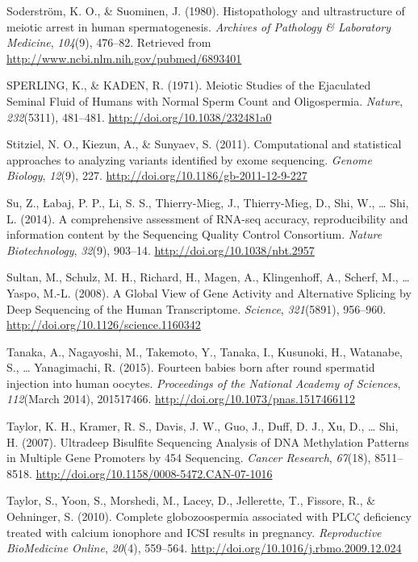 \documentclass[12pt,twoside]{reedthesis}
\theoremstyle{definition}
\theoremstyle{definition}
\theoremstyle{remark}
\begin{document}
  \hypertarget{ref-Soderstrom1980}{}
  Soderström, K. O., \& Suominen, J. (1980). Histopathology and
  ultrastructure of meiotic arrest in human spermatogenesis.
  \emph{Archives of Pathology \& Laboratory Medicine}, \emph{104}(9),
  476--82. Retrieved from \url{http://www.ncbi.nlm.nih.gov/pubmed/6893401}
  
  \hypertarget{ref-SPERLING1971}{}
  SPERLING, K., \& KADEN, R. (1971). Meiotic Studies of the Ejaculated
  Seminal Fluid of Humans with Normal Sperm Count and Oligospermia.
  \emph{Nature}, \emph{232}(5311), 481--481.
  \url{http://doi.org/10.1038/232481a0}
  
  \hypertarget{ref-Stitziel2011}{}
  Stitziel, N. O., Kiezun, A., \& Sunyaev, S. (2011). Computational and
  statistical approaches to analyzing variants identified by exome
  sequencing. \emph{Genome Biology}, \emph{12}(9), 227.
  \url{http://doi.org/10.1186/gb-2011-12-9-227}
  
  \hypertarget{ref-Su2014}{}
  Su, Z., Łabaj, P. P., Li, S. S., Thierry-Mieg, J., Thierry-Mieg, D.,
  Shi, W., \ldots{} Shi, L. (2014). A comprehensive assessment of RNA-seq
  accuracy, reproducibility and information content by the Sequencing
  Quality Control Consortium. \emph{Nature Biotechnology}, \emph{32}(9),
  903--14. \url{http://doi.org/10.1038/nbt.2957}
  
  \hypertarget{ref-Sultan2008}{}
  Sultan, M., Schulz, M. H., Richard, H., Magen, A., Klingenhoff, A.,
  Scherf, M., \ldots{} Yaspo, M.-L. (2008). A Global View of Gene Activity
  and Alternative Splicing by Deep Sequencing of the Human Transcriptome.
  \emph{Science}, \emph{321}(5891), 956--960.
  \url{http://doi.org/10.1126/science.1160342}
  
  \hypertarget{ref-Tanaka2015}{}
  Tanaka, A., Nagayoshi, M., Takemoto, Y., Tanaka, I., Kusunoki, H.,
  Watanabe, S., \ldots{} Yanagimachi, R. (2015). Fourteen babies born
  after round spermatid injection into human oocytes. \emph{Proceedings of
  the National Academy of Sciences}, \emph{112}(March 2014), 201517466.
  \url{http://doi.org/10.1073/pnas.1517466112}
  
  \hypertarget{ref-Taylor2007}{}
  Taylor, K. H., Kramer, R. S., Davis, J. W., Guo, J., Duff, D. J., Xu,
  D., \ldots{} Shi, H. (2007). Ultradeep Bisulfite Sequencing Analysis of
  DNA Methylation Patterns in Multiple Gene Promoters by 454 Sequencing.
  \emph{Cancer Research}, \emph{67}(18), 8511--8518.
  \url{http://doi.org/10.1158/0008-5472.CAN-07-1016}
  
  \hypertarget{ref-Taylor2010}{}
  Taylor, S., Yoon, S., Morshedi, M., Lacey, D., Jellerette, T., Fissore,
  R., \& Oehninger, S. (2010). Complete globozoospermia associated with
  PLC\(\zeta\) deficiency treated with calcium ionophore and ICSI results
  in pregnancy. \emph{Reproductive BioMedicine Online}, \emph{20}(4),
  559--564. \url{http://doi.org/10.1016/j.rbmo.2009.12.024}
  
\end{document}
